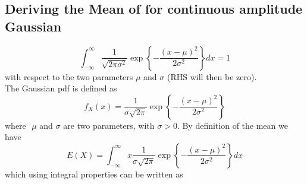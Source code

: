 \documentclass[10pt,a4paper]{article}
\begin{document}
\subsection*{Deriving the Mean of for continuous amplitude Gaussian}
\[\int_{-\infty}^{\infty}\frac{1}{\sqrt{2\pi\sigma^2}}\exp\left\{-\frac{(x-\mu)^2}{2\sigma^2}\right\}dx=1\]
with respect to the two parameters $\mu$  and $\sigma$ (RHS will then be zero).
\\The Gaussian pdf is defined as
\[f_X(x) =\frac{1}{\sigma\sqrt{2\pi}}\exp\left\{-\frac{(x-\mu)^2}{2\sigma^2}\right\}\]
where\,\, $\mu$ and $\sigma$ are two parameters, with $\sigma >0$. By definition of the mean we have
\[E(X) = \int_{-\infty}^{\infty}x\frac{1}{\sigma\sqrt{2\pi}}\exp\left\{-\frac{(x-\mu)^2}{2\sigma^2}\right\}dx\]
which using integral properties can be written as
\end{document}
